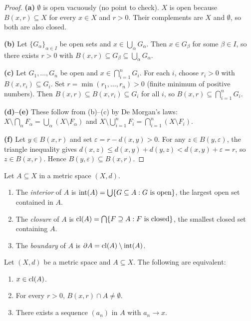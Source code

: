 \documentclass[11pt,a4paper]{article}
\begin{document}
\begin{proof}
\textbf{(a)} $\emptyset$ is open vacuously (no point to check). $X$ is open
because $B(x,r) \subseteq X$ for every $x \in X$ and $r > 0$. Their
complements are $X$ and $\emptyset$, so both are also closed.

\textbf{(b)} Let $\{G_\alpha\}_{\alpha \in I}$ be open sets and
$x \in \bigcup_\alpha G_\alpha$. Then $x \in G_\beta$ for some $\beta \in I$,
so there exists $r > 0$ with $B(x,r) \subseteq G_\beta \subseteq
\bigcup_\alpha G_\alpha$.

\textbf{(c)} Let $G_1, \ldots, G_n$ be open and $x \in \bigcap_{i=1}^n G_i$.
For each $i$, choose $r_i > 0$ with $B(x,r_i) \subseteq G_i$. Set
$r = \min(r_1, \ldots, r_n) > 0$ (finite minimum of positive numbers). Then
$B(x,r) \subseteq B(x,r_i) \subseteq G_i$ for all $i$, so
$B(x,r) \subseteq \bigcap_{i=1}^n G_i$.

\textbf{(d)--(e)} These follow from (b)--(c) by De Morgan's laws:
$X \setminus \bigcap_\alpha F_\alpha = \bigcup_\alpha (X \setminus F_\alpha)$
and
$X \setminus \bigcup_{i=1}^n F_i = \bigcap_{i=1}^n (X \setminus F_i)$.

\textbf{(f)} Let $y \in B(x,r)$ and set $\varepsilon = r - d(x,y) > 0$. For
any $z \in B(y,\varepsilon)$, the triangle inequality gives
$d(x,z) \le d(x,y) + d(y,z) < d(x,y) + \varepsilon = r$, so
$z \in B(x,r)$. Hence $B(y,\varepsilon) \subseteq B(x,r)$.
\end{proof}

\begin{definition}
\label{def:int_cl_bd}
Let $A \subseteq X$ in a metric space $(X,d)$.
\begin{enumerate}[nosep,label=(\roman*)]
  \item The \emph{interior} of $A$ is
    $\operatorname{int}(A) = \bigcup\{G \subseteq A : G \text{ is open}\}$,
    the largest open set contained in $A$.
  \item The \emph{closure} of $A$ is
    $\operatorname{cl}(A) = \bigcap\{F \supseteq A : F \text{ is closed}\}$,
    the smallest closed set containing $A$.
  \item The \emph{boundary} of $A$ is
    $\partial A = \operatorname{cl}(A) \setminus \operatorname{int}(A)$.
\end{enumerate}
\end{definition}

\begin{proposition}
\label{prop:closure_char}
Let $(X,d)$ be a metric space and $A \subseteq X$. The following are
equivalent:
\begin{enumerate}[nosep,label=(\roman*)]
  \item $x \in \operatorname{cl}(A)$.
  \item For every $r > 0$, $B(x,r) \cap A \ne \emptyset$.
  \item There exists a sequence $(a_n)$ in $A$ with $a_n \to x$.
\end{enumerate}
\end{proposition}
\end{document}
